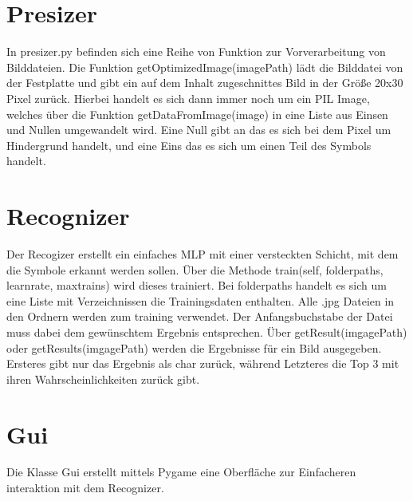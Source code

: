 \documentclass[a4paper]{article}
\begin{document}
	\section{Presizer}
		In presizer.py befinden sich eine Reihe von Funktion zur Vorverarbeitung von Bilddateien.
		Die Funktion getOptimizedImage(imagePath) lädt die Bilddatei von der Festplatte und gibt ein auf dem Inhalt zugeschnittes 
		Bild in der Größe 20x30 Pixel zurück. Hierbei handelt es sich dann immer noch um ein PIL Image, welches über die Funktion
		getDataFromImage(image) in eine Liste aus Einsen und Nullen umgewandelt wird. Eine Null gibt an das es sich bei dem Pixel um 
		Hindergrund handelt, und eine Eins das es sich um einen Teil des Symbols handelt.

	\section{Recognizer} 
		Der Recogizer erstellt ein einfaches MLP mit einer versteckten Schicht, mit dem die Symbole erkannt werden sollen.
		Über die Methode train(self, folderpaths, learnrate, maxtrains) wird dieses trainiert. Bei folderpaths handelt es 
		sich um eine Liste mit Verzeichnissen die Trainingsdaten enthalten. Alle .jpg Dateien in den Ordnern werden zum training 
		verwendet. Der Anfangsbuchstabe der Datei muss dabei dem gewünschtem Ergebnis entsprechen.
		Über getResult(imgagePath) oder getResults(imgagePath) werden die Ergebnisse für ein Bild ausgegeben. Ersteres gibt 
		nur das Ergebnis als char zurück, während Letzteres die Top 3 mit ihren Wahrscheinlichkeiten zurück gibt.

	\section{Gui}
		Die Klasse Gui erstellt mittels Pygame eine Oberfläche zur Einfacheren interaktion mit dem Recognizer. 

	
\end{document}
